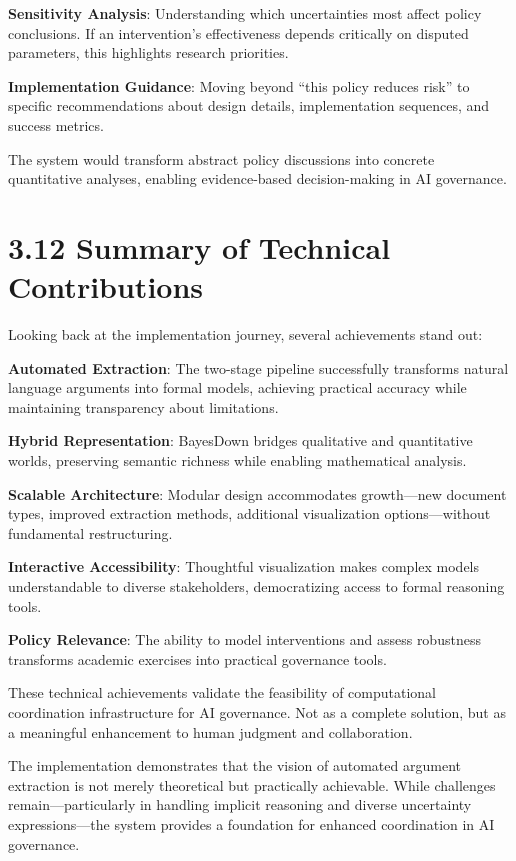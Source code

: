 \documentclass[
  11pt,
  letterpaper,
]{book}
\begin{document}
\textbf{Sensitivity Analysis}: Understanding which uncertainties most
affect policy conclusions. If an intervention's effectiveness depends
critically on disputed parameters, this highlights research priorities.

\textbf{Implementation Guidance}: Moving beyond ``this policy reduces
risk'' to specific recommendations about design details, implementation
sequences, and success metrics.

The system would transform abstract policy discussions into concrete
quantitative analyses, enabling evidence-based decision-making in AI
governance.

\section{3.12 Summary of Technical
Contributions}\label{sec-technical-summary}

Looking back at the implementation journey, several achievements stand
out:

\textbf{Automated Extraction}: The two-stage pipeline successfully
transforms natural language arguments into formal models, achieving
practical accuracy while maintaining transparency about limitations.

\textbf{Hybrid Representation}: BayesDown bridges qualitative and
quantitative worlds, preserving semantic richness while enabling
mathematical analysis.

\textbf{Scalable Architecture}: Modular design accommodates growth---new
document types, improved extraction methods, additional visualization
options---without fundamental restructuring.

\textbf{Interactive Accessibility}: Thoughtful visualization makes
complex models understandable to diverse stakeholders, democratizing
access to formal reasoning tools.

\textbf{Policy Relevance}: The ability to model interventions and assess
robustness transforms academic exercises into practical governance
tools.

These technical achievements validate the feasibility of computational
coordination infrastructure for AI governance. Not as a complete
solution, but as a meaningful enhancement to human judgment and
collaboration.

The implementation demonstrates that the vision of automated argument
extraction is not merely theoretical but practically achievable. While
challenges remain---particularly in handling implicit reasoning and
diverse uncertainty expressions---the system provides a foundation for
enhanced coordination in AI governance.
\end{document}
